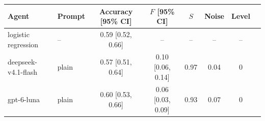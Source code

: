 \begin{tabular}{llcccccc}
\toprule
Agent & Prompt & Accuracy [95\% CI] & $F$ [95\% CI] & $S$ & Noise & Level \\
\midrule
logistic regression & -- & 0.59 [0.52, 0.66] & -- & -- & -- & -- \\
deepseek-v4.1-flash & plain & 0.57 [0.51, 0.64] & 0.10 [0.06, 0.14] & 0.97 & 0.04 & 0 \\
gpt-6-luna & plain & 0.60 [0.53, 0.66] & 0.06 [0.03, 0.09] & 0.93 & 0.07 & 0 \\
\bottomrule
\end{tabular}
